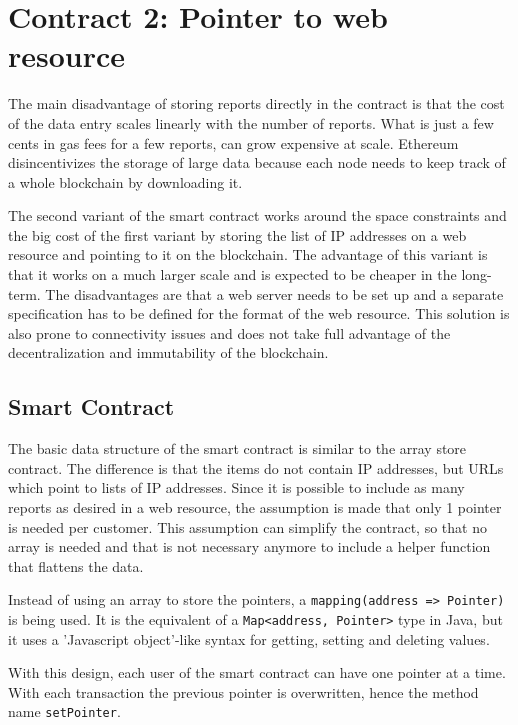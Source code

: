 \section{Contract 2: Pointer to web resource}
The main disadvantage of storing reports directly in the contract is that the cost of the data entry scales linearly with the number of reports. What is just a few cents in gas fees for a few reports, can grow expensive at scale.
Ethereum disincentivizes the storage of large data because each node needs to keep track of a whole blockchain by downloading it. 

The second variant of the smart contract works around the space constraints and the big cost of the first variant by storing the list of IP addresses on a web resource and pointing to it on the blockchain. The advantage of this variant is that it works on a much larger scale and is expected to be cheaper in the long-term. The disadvantages are that a web server needs to be set up and a separate specification has to be defined for the format of the web resource. This solution is also prone to connectivity issues and does not take full advantage of the decentralization and immutability of the blockchain.

\subsection{Smart Contract}
The basic data structure of the smart contract is similar to the array store contract. The difference is that the items do not contain IP addresses, but URLs which point to lists of IP addresses. Since it is possible to include as many reports as desired in a web resource, the assumption is made that only 1 pointer is needed per customer. This assumption can simplify the contract, so that no array is needed and that is not necessary anymore to include a helper function that flattens the data.



Instead of using an array to store the pointers, a \texttt{mapping(address => Pointer)} is being used. It is the equivalent of a \texttt{Map<address, Pointer>} type in Java, but it uses a 'Javascript object'-like syntax for getting, setting and deleting values.

With this design, each user of the smart contract can have one pointer at a time. With each transaction the previous pointer is overwritten, hence the method name \texttt{setPointer}.

